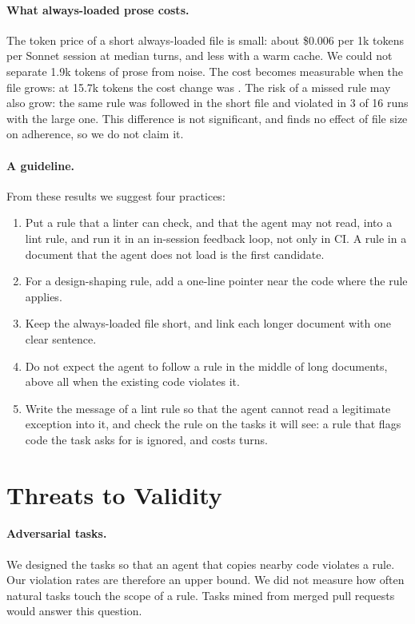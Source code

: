 \documentclass[pdflatex,sn-mathphys-num]{sn-jnl}
\begin{document}
\paragraph{What always-loaded prose costs.}
The token price of a short always-loaded file is small: about \$0.006 per 1k tokens per Sonnet session at median turns, and less with a warm cache.
We could not separate 1.9k tokens of prose from noise.
The cost becomes measurable when the file grows: at 15.7k tokens the cost change was \HSixCost{}.
The risk of a missed rule may also grow: the same rule was followed in the short file and violated in 3 of 16 runs with the large one.
This difference is not significant, and \citet{mcmillan2026adherence} finds no effect of file size on adherence, so we do not claim it.

\paragraph{A guideline.}
From these results we suggest four practices:
\begin{enumerate}
\item Put a rule that a linter can check, and that the agent may not read, into a lint rule, and run it in an in-session feedback loop, not only in CI.
A rule in a document that the agent does not load is the first candidate.
\item For a design-shaping rule, add a one-line pointer near the code where the rule applies.
\item Keep the always-loaded file short, and link each longer document with one clear sentence.
\item Do not expect the agent to follow a rule in the middle of long documents, above all when the existing code violates it.
\item Write the message of a lint rule so that the agent cannot read a legitimate exception into it, and check the rule on the tasks it will see: a rule that flags code the task asks for is ignored, and costs turns.
\end{enumerate}

\section{Threats to Validity}
\label{sec:threats}

\paragraph{Adversarial tasks.}
We designed the tasks so that an agent that copies nearby code violates a rule.
Our violation rates are therefore an upper bound.
We did not measure how often natural tasks touch the scope of a rule.
Tasks mined from merged pull requests would answer this question.
\end{document}

